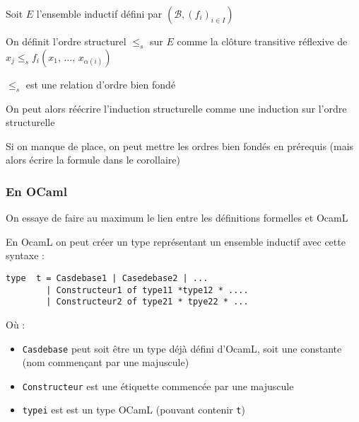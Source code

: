 \begin{definition}
	Soit $E$ l'ensemble inductif défini par $(\mathcal B, (f_i)_{i \in I})$
	
	On définit l'ordre structurel $\leq_s$ sur $E$ comme la clôture transitive réflexive de $x_j \leq_s f_i(x_1, \, \dots, \, x_{\alpha(i)})$
\end{definition}

\begin{proposition}
	$\leq_s$ est une relation d'ordre bien fondé
\end{proposition}

\begin{corollary}
	On peut alors réécrire l'induction structurelle comme une induction sur l'ordre structurelle
\end{corollary}

\begin{com}
	Si on manque de place, on peut mettre les ordres bien fondés en prérequis (mais alors écrire la formule dans le corollaire)
\end{com}

\subsubsection{En OCaml}

\begin{com}
	On essaye de faire au maximum le lien entre les définitions formelles et OcamL
\end{com}

\begin{syntaxe}
	En OcamL on peut créer un type représentant un ensemble inductif avec cette syntaxe :
	\begin{lstlisting}
type  t = Casdebase1 | Casedebase2 | ... 
        | Constructeur1 of type11 *type12 * .... 
        | Constructeur2 of type21 * tpye22 * ...
	\end{lstlisting}
	
	Où : \begin{itemize}
		\item \texttt{Casdebase} peut soit être un type déjà défini d'OcamL, soit une constante (nom commençant par une majuscule)
		\item \texttt{Constructeur} est une étiquette commencée par une majuscule 
		\item \texttt{typei} est est un type OCamL (pouvant contenir \texttt t)
	\end{itemize}
\end{syntaxe}

